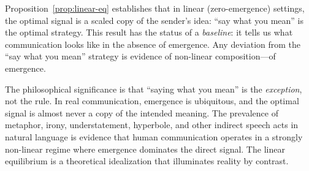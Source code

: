 \begin{remark}
\label{rem:ch14:linear_eq_say_what_you_mean}
Proposition~\ref{prop:linear-eq} establishes that in linear (zero-emergence)
settings, the optimal signal is a scaled copy of the sender's idea:
``say what you mean'' is the optimal strategy.  This result has the status
of a \emph{baseline}: it tells us what communication looks like in the
absence of emergence.  Any deviation from the ``say what you mean'' strategy
is evidence of non-linear composition---of emergence.

The philosophical significance is that ``saying what you mean'' is
the \emph{exception}, not the rule.  In real communication, emergence is
ubiquitous, and the optimal signal is almost never a copy of the intended
meaning.  The prevalence of metaphor, irony, understatement, hyperbole,
and other indirect speech acts in natural language is evidence that human
communication operates in a strongly non-linear regime where emergence
dominates the direct signal.  The linear equilibrium is a theoretical
idealization that illuminates reality by contrast.
\end{remark}

